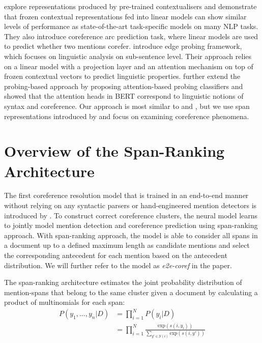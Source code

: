 \documentclass[11pt]{article}
\begin{document}
\textcite{liu2019linguistic} explore representations produced by pre-trained contextualisers and demonstrate that frozen contextual representations fed into linear models can show similar levels of performance as state-of-the-art task-specific models on many NLP tasks. They also introduce coreference arc prediction task, where linear models are used to predict whether two mentions corefer. \textcite{tenney2019context} introduce edge probing framework, which focuses on linguistic analysis on sub-sentence level. Their approach relies on a linear model with a projection layer and an attention mechanism on top of frozen contextual vectors to predict linguistic properties. \textcite{clark2019what} further extend the probing-based approach by proposing attention-based probing classifiers and showed that the attention heads in BERT correspond to linguistic notions of syntax and coreference. Our approach is most similar to \textcite{liu2019linguistic} and \textcite{tenney2019context}, but we use span representations introduced by \textcite{lee2017end} and focus on examining coreference phenomena.




\section{Overview of the Span-Ranking Architecture}
The first coreference resolution model that is trained in an end-to-end manner without relying on any syntactic parsers or hand-engineered mention detectors is introduced by \textcite{lee2017end}. To construct correct coreference clusters, the neural model learns to jointly model mention detection and coreference prediction using span-ranking approach.  With span-ranking approach, the model is able to consider all spans in a document up to a defined maximum length as candidate mentions and select the corresponding antecedent for each mention based on the antecedent distribution. We will further refer to the model as \textit{e2e-coref} in the paper.

The span-ranking architecture estimates the joint probability distribution of mention-spans that belong to the same cluster given a document by calculating a product of multinomials for each span:
\begin{align}
P(y_{1}, ..., y_{n}|D) &= \prod\limits_{i=1}^{N} P(y_{i}|D) \\
&= \prod\limits_{i=1}^{N} \frac{\text{exp}(s(i, y_{i}))}{\sum_{y' \in \mathcal{Y}(i)} \text{exp}(s(i, y'))}
\end{align}
\end{document}
